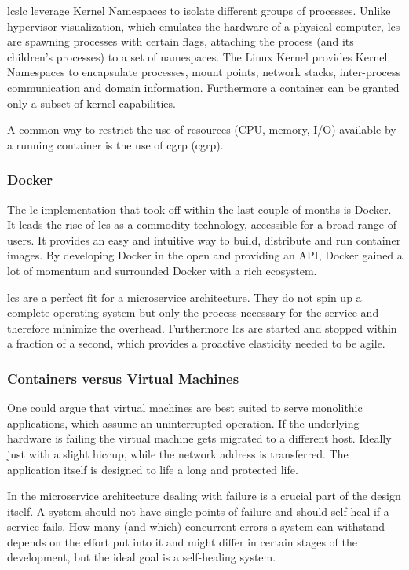 \glspl{lc}\glsdesc{lc} leverage Kernel Namespaces to isolate different groups of processes. Unlike hypervisor visualization, which emulates
the hardware of a physical computer, \glspl{lc} are spawning processes with certain flags, attaching the process (and its children's processes)
to a set of namespaces. The Linux Kernel provides Kernel Namespaces to encapsulate processes, mount points, network stacks,
inter-process communication and domain information. Furthermore a container can be granted only a subset of kernel capabilities.

A common way to restrict the use of resources (CPU, memory, I/O) available by a running container is the use of \gls{cgrp} (\glsdesc{cgrp}).

\subsubsection{Docker}
The \gls{lc} implementation that took off within the last couple of months is Docker. It leads the rise of \glspl{lc} as a commodity technology, accessible
for a broad range of users. It provides an easy and intuitive way to build, distribute and run container images.
By developing Docker in the open and providing an API, Docker gained a lot of momentum and surrounded Docker with a rich ecosystem.

\glspl{lc} are a perfect fit for a microservice architecture. They do not spin up a complete operating system but only the process
necessary for the service and therefore minimize the overhead. Furthermore \glspl{lc} are started and stopped within a
fraction of a second, which provides a proactive elasticity needed to be agile.

\subsubsection{Containers versus Virtual Machines}
One could argue that virtual machines are best suited to serve monolithic applications,
which assume an uninterrupted operation. If the underlying hardware is failing the virtual machine gets migrated to a different host. Ideally just
with a slight hiccup, while the network address is transferred. The application itself is designed to life a long and protected life.

In the microservice architecture dealing with failure is a crucial part of the design itself. A system should not have single points of failure and
should self-heal if a service fails. How many (and which) concurrent errors a system can withstand depends on the effort put into it and might differ
in certain stages of the development, but the ideal goal is a self-healing system.



